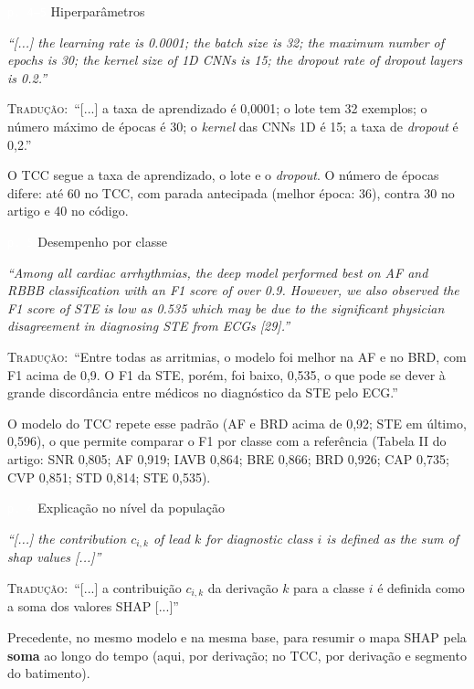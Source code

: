 \documentclass[11pt,a4paper]{article}
\newcommand{\pagechip}[1]{{\setlength{\fboxsep}{1.5pt}\colorbox{cAcc}{\textcolor{white}{\scriptsize\texttt{#1}}}}}
\newenvironment{origquote}{\par\itshape\small}{\par}
\newenvironment{tradquote}{\par\small\textsc{Tradução:}\ }{\par}
\newcommand{\explab}[1]{\par\smallskip{\small\color{cAcc}\textbf{\MakeUppercase{#1}}}\par}
\begin{document}
\begin{citacard}{\pagechip{p. 4--5} Hiperparâmetros}
\begin{origquote}“[...] the learning rate is 0.0001; the batch size is 32; the maximum number of epochs is 30; the kernel size of 1D CNNs is 15; the dropout rate of dropout layers is 0.2.”\end{origquote}
\begin{tradquote}“[...] a taxa de aprendizado é 0,0001; o lote tem 32 exemplos; o número máximo de épocas é 30; o \textit{kernel} das CNNs 1D é 15; a taxa de \textit{dropout} é 0,2.”\end{tradquote}
\explab{Explicação}
O TCC segue a taxa de aprendizado, o lote e o \textit{dropout}. O número de épocas difere: até 60 no TCC, com parada antecipada (melhor época: 36), contra 30 no artigo e 40 no código.
\end{citacard}

\begin{citacard}{\pagechip{p. 5} Desempenho por classe}
\begin{origquote}“Among all cardiac arrhythmias, the deep model performed best on AF and RBBB classification with an F1 score of over 0.9. However, we also observed the F1 score of STE is low as 0.535 which may be due to the significant physician disagreement in diagnosing STE from ECGs [29].”\end{origquote}
\begin{tradquote}“Entre todas as arritmias, o modelo foi melhor na AF e no BRD, com F1 acima de 0,9. O F1 da STE, porém, foi baixo, 0,535, o que pode se dever à grande discordância entre médicos no diagnóstico da STE pelo ECG.”\end{tradquote}
\explab{Explicação}
O modelo do TCC repete esse padrão (AF e BRD acima de 0,92; STE em último, 0,596), o que permite comparar o F1 por classe com a referência (Tabela II do artigo: SNR 0,805; AF 0,919; IAVB 0,864; BRE 0,866; BRD 0,926; CAP 0,735; CVP 0,851; STD 0,814; STE 0,535).
\end{citacard}

\begin{citacard}{\pagechip{p. 4} Explicação no nível da população}
\begin{origquote}“[...] the contribution $c_{i,k}$ of lead $k$ for diagnostic class $i$ is defined as the sum of shap values [...]”\end{origquote}
\begin{tradquote}“[...] a contribuição $c_{i,k}$ da derivação $k$ para a classe $i$ é definida como a soma dos valores SHAP [...]”\end{tradquote}
\explab{Explicação}
Precedente, no mesmo modelo e na mesma base, para resumir o mapa SHAP pela \textbf{soma} ao longo do tempo (aqui, por derivação; no TCC, por derivação e segmento do batimento).
\end{citacard}
\end{document}

